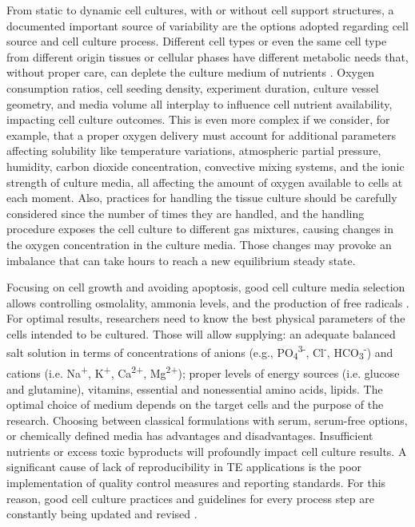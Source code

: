 From static to dynamic cell cultures, with or without cell support structures, a documented important source of variability are the options adopted regarding cell source and cell culture process. Different cell types or even the same cell type from different origin tissues or cellular phases have different metabolic needs that, without proper care, can deplete the culture medium of nutrients \cite{Al-Ani2018-df}. Oxygen consumption ratios, cell seeding density, experiment duration, culture vessel geometry, and media volume all interplay to influence cell nutrient availability, impacting cell culture outcomes. This is even more complex if we consider, for example, that a  proper oxygen delivery must account for additional parameters affecting solubility like temperature variations, atmospheric partial pressure, humidity, carbon dioxide concentration, convective mixing systems, and the ionic strength of culture media, all affecting the amount of oxygen available to cells at each moment. Also, practices for handling the tissue culture should be carefully considered since the number of times they are handled, and the handling procedure exposes the cell culture to different gas mixtures, causing changes in the oxygen concentration in the culture media. Those changes may provoke an imbalance that can take hours to reach a new equilibrium steady state.

Focusing on cell growth and avoiding apoptosis, good cell culture media selection allows controlling osmolality, ammonia levels, and the production of free radicals \cite{Price2017-mm}. For optimal results, researchers need to know the best physical parameters of the cells intended to be cultured. Those will allow supplying: an adequate balanced salt solution in terms of concentrations of anions (e.g., PO\textsubscript{4}\textsuperscript{3-}, Cl\textsuperscript{-}, HCO\textsubscript{3}\textsuperscript{-}) and cations (i.e. Na\textsuperscript{+}, K\textsuperscript{+}, Ca\textsuperscript{2+}, Mg\textsuperscript{2+}); proper levels of energy sources (i.e. glucose and glutamine), vitamins, essential and nonessential amino acids, lipids. The optimal choice of medium depends on the target cells and the purpose of the research. Choosing between classical formulations with serum, serum-free options, or chemically defined media has advantages and disadvantages. Insufficient nutrients or excess toxic byproducts will profoundly impact cell culture results. A significant cause of lack of reproducibility in \ac{TE} applications is the poor implementation of quality control measures and reporting standards. For this reason, good cell culture practices and guidelines for every process step are constantly being updated and revised \cite{Pamies2018-fm, Geraghty2014-rb, Pamies2022-cq}.

